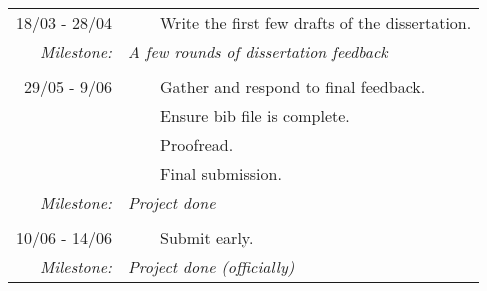 \documentclass[12pt,a4paper, headings=standardclasses]{scrartcl}
\newcommand{\tabitem}{~~\llap{\textbullet}~~}
\begin{document}
\begin{tabularx}{\textwidth}{rX} \toprule

    18/03 - 28/04
     & \tabitem Write the first few drafts of the dissertation. \\
    \textit{Milestone:}
     & \textit{A few rounds of dissertation feedback}           \\

     &                                                          \\

    29/05 - 9/06
     & \tabitem Gather and respond to final feedback.           \\
     & \tabitem Ensure bib file is complete.                    \\
     & \tabitem Proofread.                                      \\
     & \tabitem Final submission.                               \\
    \textit{Milestone:}
     & \textit{Project done}                                    \\

     &                                                          \\

    10/06 - 14/06
     & \tabitem Submit early.                                   \\
    \textit{Milestone:}
     & \textit{Project done (officially)}                       \\
    \bottomrule
\end{tabularx}
\end{document}
